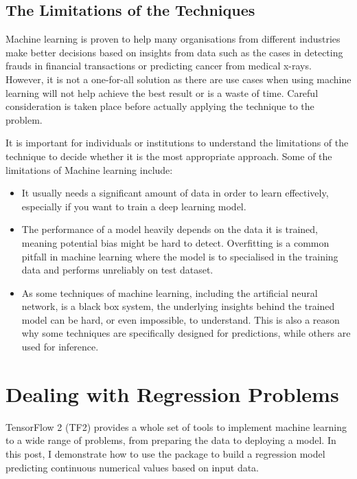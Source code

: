 \documentclass[
  letterpaper,
  DIV=11,
  numbers=noendperiod]{scrreprt}
\providecommand{\tightlist}{%
  \setlength{\itemsep}{0pt}\setlength{\parskip}{0pt}}\usepackage{longtable,booktabs,array}
\begin{document}
\hypertarget{the-limitations-of-the-techniques}{%
\section{The Limitations of the
Techniques}\label{the-limitations-of-the-techniques}}

Machine learning is proven to help many organisations from different
industries make better decisions based on insights from data such as the
cases in detecting frauds in financial transactions or predicting cancer
from medical x-rays. However, it is not a one-for-all solution as there
are use cases when using machine learning will not help achieve the best
result or is a waste of time. Careful consideration is taken place
before actually applying the technique to the problem.

It is important for individuals or institutions to understand the
limitations of the technique to decide whether it is the most
appropriate approach. Some of the limitations of Machine learning
include:

\begin{itemize}
\tightlist
\item
  It usually needs a significant amount of data in order to learn
  effectively, especially if you want to train a deep learning model.
\item
  The performance of a model heavily depends on the data it is trained,
  meaning potential bias might be hard to detect. Overfitting is a
  common pitfall in machine learning where the model is to specialised
  in the training data and performs unreliably on test dataset.
\item
  As some techniques of machine learning, including the artificial
  neural network, is a black box system, the underlying insights behind
  the trained model can be hard, or even impossible, to understand. This
  is also a reason why some techniques are specifically designed for
  predictions, while others are used for inference.
\end{itemize}

\hypertarget{dealing-with-regression-problems}{%
\chapter{Dealing with Regression
Problems}\label{dealing-with-regression-problems}}

TensorFlow 2 (TF2) provides a whole set of tools to implement machine
learning to a wide range of problems, from preparing the data to
deploying a model. In this post, I demonstrate how to use the package to
build a regression model predicting continuous numerical values based on
input data.
\end{document}
